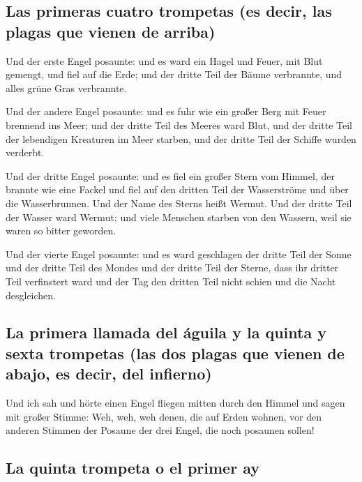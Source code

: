\hypertarget{las-primeras-cuatro-trompetas-es-decir-las-plagas-que-vienen-de-arriba}{%
\subsection{Las primeras cuatro trompetas (es decir, las plagas que
vienen de
arriba)}\label{las-primeras-cuatro-trompetas-es-decir-las-plagas-que-vienen-de-arriba}}

 Und der erste Engel posaunte: und es ward ein Hagel und
Feuer, mit Blut gemengt, und fiel auf die Erde; und der dritte Teil der
Bäume verbrannte, und alles grüne Gras verbrannte.

 Und der andere Engel posaunte: und es fuhr wie ein großer
Berg mit Feuer brennend ins Meer; und der dritte Teil des Meeres ward
Blut,  und der dritte Teil der lebendigen Kreaturen im
Meer starben, und der dritte Teil der Schiffe wurden verderbt.

 Und der dritte Engel posaunte: und es fiel ein großer
Stern vom Himmel, der brannte wie eine Fackel und fiel auf den dritten
Teil der Wasserströme und über die Wasserbrunnen.  Und
der Name des Sterns heißt Wermut. Und der dritte Teil der Wasser ward
Wermut; und viele Menschen starben von den Wassern, weil sie waren so
bitter geworden.

 Und der vierte Engel posaunte: und es ward geschlagen
der dritte Teil der Sonne und der dritte Teil des Mondes und der dritte
Teil der Sterne, dass ihr dritter Teil verfinstert ward und der Tag den
dritten Teil nicht schien und die Nacht desgleichen.

\hypertarget{la-primera-llamada-del-uxe1guila-y-la-quinta-y-sexta-trompetas-las-dos-plagas-que-vienen-de-abajo-es-decir-del-infierno}{%
\subsection{La primera llamada del águila y la quinta y sexta trompetas
(las dos plagas que vienen de abajo, es decir, del
infierno)}\label{la-primera-llamada-del-uxe1guila-y-la-quinta-y-sexta-trompetas-las-dos-plagas-que-vienen-de-abajo-es-decir-del-infierno}}

 Und ich sah und hörte einen Engel fliegen mitten durch
den Himmel und sagen mit großer Stimme: Weh, weh, weh denen, die auf
Erden wohnen, vor den anderen Stimmen der Posaune der drei Engel, die
noch posaunen sollen!

\hypertarget{la-quinta-trompeta-o-el-primer-ay}{%
\subsection{La quinta trompeta o el primer
ay}\label{la-quinta-trompeta-o-el-primer-ay}}


